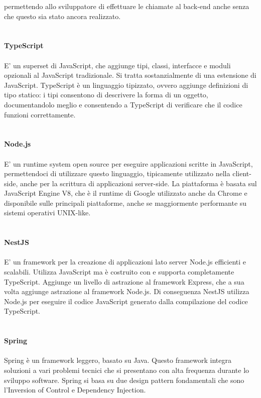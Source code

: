 permettendo allo sviluppatore di effettuare le chiamate al \gls{back-end} anche senza che questo sia stato ancora realizzato.
\\\\\\
\textbf{TypeScript}
\\\\
E' un superset di JavaScript, che aggiunge tipi, classi, interfacce e moduli opzionali al JavaScript 
tradizionale. Si tratta sostanzialmente di una estensione di JavaScript.
TypeScript è un linguaggio tipizzato, ovvero aggiunge definizioni di tipo statico: i tipi consentono di 
descrivere la forma di un oggetto, documentandolo meglio e consentendo a TypeScript di verificare che 
il codice funzioni correttamente.
\\\\\\
\textbf{Node.js}
\\\\
E' un runtime system open source per eseguire applicazioni scritte in JavaScript, permettendoci di utilizzare questo 
linguaggio, tipicamente utilizzato nella client-side, anche per la scrittura di applicazioni server-side.
La piattaforma è basata sul JavaScript Engine V8, che è il runtime di Google utilizzato anche da Chrome e 
disponibile sulle principali piattaforme, anche se maggiormente performante su sistemi operativi UNIX-like.
\\\\\\
\textbf{NestJS}
\\\\
E' un framework per la creazione di applicazioni lato server Node.js efficienti e scalabili. 
Utilizza JavaScript ma è costruito con e supporta completamente TypeScript. Aggiunge un livello di astrazione
al framework Express, che a sua volta aggiunge astrazione al framework Node.js. Di conseguenza NestJS 
utilizza Node.js per eseguire il codice JavaScript generato dalla compilazione del codice TypeScript.
\\\\\\
\textbf{Spring}
\\\\
Spring è un framework leggero, basato su Java. Questo framework integra soluzioni a vari problemi tecnici
che si presentano con alta frequenza durante lo sviluppo software. Spring si basa su due design pattern
fondamentali che sono l'Inversion of Control e Dependency Injection.
\\\\\\
